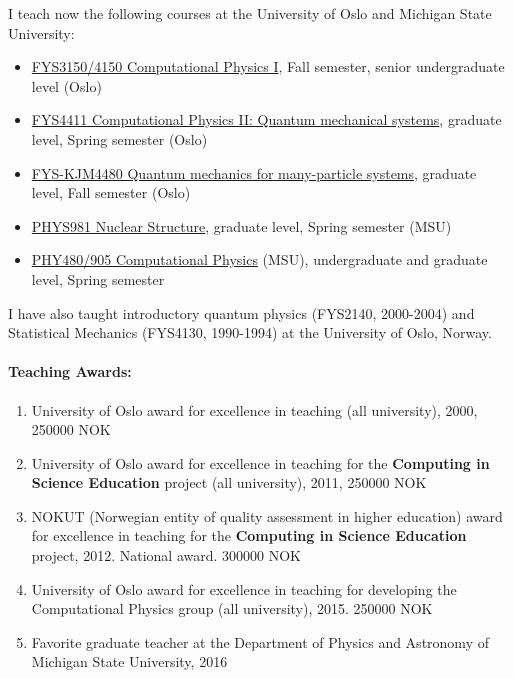 \documentclass[%
oneside,                 %
final,                   %
10pt]{article}
\begin{document}
I teach now the following courses at the University of Oslo and Michigan State University:

\begin{itemize}
\item \href{{http://www.uio.no/studier/emner/matnat/fys/FYS3150/}}{FYS3150/4150 Computational Physics I}, Fall semester, senior undergraduate level (Oslo) 

\item \href{{http://www.uio.no/studier/emner/matnat/fys/FYS4411/}}{FYS4411 Computational Physics II: Quantum mechanical systems}, graduate level, Spring semester (Oslo) 

\item \href{{http://www.uio.no/studier/emner/matnat/fys/FYS-kjm4480/}}{FYS-KJM4480 Quantum mechanics for many-particle systems}, graduate level, Fall semester (Oslo) 

\item \href{{https://github.com/NuclearStructure/PHY981}}{PHYS981 Nuclear Structure}, graduate level, Spring semester (MSU) 

\item \href{{https://github.com/CompPhysics/ComputationalPhysicsMSU}}{PHY480/905 Computational Physics} (MSU), undergraduate and graduate level, Spring semester
\end{itemize}

\noindent
I have also taught introductory quantum physics (FYS2140, 2000-2004) and Statistical Mechanics (FYS4130, 1990-1994) at the University of Oslo, Norway.

\paragraph{Teaching Awards:}
\begin{enumerate}
\item University of Oslo award for excellence in teaching (all university), 2000, 250000 NOK

\item University of Oslo award for excellence in teaching for the \textbf{Computing in Science Education} project (all university), 2011, 250000 NOK

\item NOKUT (Norwegian entity of quality assessment in higher education) award for excellence in teaching for the \textbf{Computing in Science Education} project, 2012. National award. 300000 NOK

\item University of Oslo award for excellence in teaching for developing the Computational Physics group (all university), 2015. 250000 NOK

\item Favorite graduate teacher at the Department of Physics and Astronomy of Michigan State University, 2016 
\end{enumerate}
\end{document}
